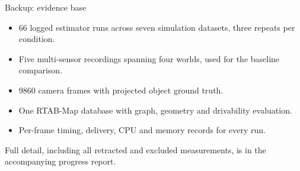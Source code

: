 \documentclass[aspectratio=169,11pt]{beamer}
\begin{document}
\begin{frame}{Backup: evidence base}
  \begin{itemize}
    \item 66 logged estimator runs across seven simulation datasets, three
      repeats per condition.
    \item Five multi-sensor recordings spanning four worlds, used for the
      baseline comparison.
    \item \SI{9860}{} camera frames with projected object ground truth.
    \item One RTAB-Map database with graph, geometry and drivability evaluation.
    \item Per-frame timing, delivery, CPU and memory records for every run.
  \end{itemize}

  \vspace{1em}
  Full detail, including all retracted and excluded measurements, is in the
  accompanying progress report.
\end{frame}
\end{document}
